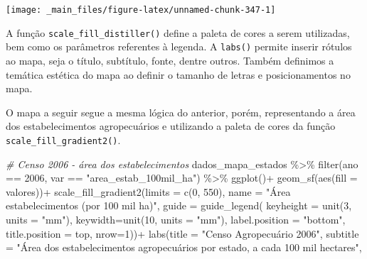 \documentclass[
  brazilian,
]{book}
\newenvironment{Shaded}{\begin{snugshade}}{\end{snugshade}}
\newcommand{\AttributeTok}[1]{\textcolor[rgb]{0.77,0.63,0.00}{#1}}
\newcommand{\CommentTok}[1]{\textcolor[rgb]{0.56,0.35,0.01}{\textit{#1}}}
\newcommand{\DecValTok}[1]{\textcolor[rgb]{0.00,0.00,0.81}{#1}}
\newcommand{\FunctionTok}[1]{\textcolor[rgb]{0.00,0.00,0.00}{#1}}
\newcommand{\NormalTok}[1]{#1}
\newcommand{\SpecialCharTok}[1]{\textcolor[rgb]{0.00,0.00,0.00}{#1}}
\newcommand{\StringTok}[1]{\textcolor[rgb]{0.31,0.60,0.02}{#1}}
\begin{document}
\begin{center}\texttt{[image: \_main\_files/figure-latex/unnamed-chunk-347-1]} \end{center}

A função \texttt{scale\_fill\_distiller()} define a paleta de cores a serem utilizadas, bem como os parâmetros referentes à legenda. A \texttt{labs()} permite inserir rótulos ao mapa, seja o título, subtítulo, fonte, dentre outros. Também definimos a temática estética do mapa ao definir o tamanho de letras e posicionamentos no mapa.

O mapa a seguir segue a mesma lógica do anterior, porém, representando a área dos estabelecimentos agropecuários e utilizando a paleta de cores da função \texttt{scale\_fill\_gradient2()}.

\begin{Shaded}
\begin{Highlighting}[]
\CommentTok{\# Censo 2006 {-} área dos estabelecimentos}
\NormalTok{dados\_mapa\_estados }\SpecialCharTok{\%\textgreater{}\%} 
  \FunctionTok{filter}\NormalTok{(ano }\SpecialCharTok{==} \DecValTok{2006}\NormalTok{,}
\NormalTok{         var }\SpecialCharTok{==} \StringTok{"area\_estab\_100mil\_ha"}\NormalTok{) }\SpecialCharTok{\%\textgreater{}\%} 
  \FunctionTok{ggplot}\NormalTok{()}\SpecialCharTok{+}
  \FunctionTok{geom\_sf}\NormalTok{(}\FunctionTok{aes}\NormalTok{(}\AttributeTok{fill =}\NormalTok{ valores))}\SpecialCharTok{+}
  \FunctionTok{scale\_fill\_gradient2}\NormalTok{(}\AttributeTok{limits =} \FunctionTok{c}\NormalTok{(}\DecValTok{0}\NormalTok{, }\DecValTok{550}\NormalTok{),}
                       \AttributeTok{name =} \StringTok{"Área estabelecimentos (por 100 mil ha)"}\NormalTok{,}
                       \AttributeTok{guide =} \FunctionTok{guide\_legend}\NormalTok{(}
                         \AttributeTok{keyheight =} \FunctionTok{unit}\NormalTok{(}\DecValTok{3}\NormalTok{, }\AttributeTok{units =} \StringTok{"mm"}\NormalTok{),}
                         \AttributeTok{keywidth=}\FunctionTok{unit}\NormalTok{(}\DecValTok{10}\NormalTok{, }\AttributeTok{units =} \StringTok{"mm"}\NormalTok{),}
                         \AttributeTok{label.position =} \StringTok{"bottom"}\NormalTok{,}
                         \AttributeTok{title.position =} \StringTok{\textquotesingle{}top\textquotesingle{}}\NormalTok{, }\AttributeTok{nrow=}\DecValTok{1}\NormalTok{))}\SpecialCharTok{+}
  \FunctionTok{labs}\NormalTok{(}\AttributeTok{title =} \StringTok{"Censo Agropecuário 2006"}\NormalTok{,}
       \AttributeTok{subtitle =} \StringTok{"Área dos estabelecimentos agropecuários por estado, a cada 100 mil hectares"}\NormalTok{,}

\end{Highlighting}
\end{Shaded}
\end{document}
